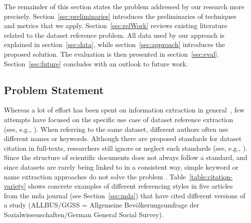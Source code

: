 \documentclass{IOS-Book-Article}
\begin{document}
The remainder of this section states the problem addressed by our research more precisely.
Section~\ref{sec:preliminaries} introduces the preliminaries of techniques and metrics that we apply.
Section~\ref{sec:relWork} reviews existing literature related to the dataset reference problem.
All data used by our approach is explained in section~\ref{sec:data}, while section~\ref{sec:approach} introduces the proposed solution.
The evaluation is then presented in section~\ref{sec:eval}.
Section~\ref{sec:future} concludes with an outlook to future work. 
 
\subsection{Problem Statement}
Whereas a lot of effort has been spent on information extraction in general~\citep{Sarawagi2007}, few attempts have focused on the specific use case of dataset reference extraction (see, e.g., \citep{MeiyuLu2012}). 
When referring to the same dataset, different authors often use different names or keywords.
Although there are proposed standards for dataset citation in full-texts, researchers still ignore or neglect such standards (see, e.g., \cite{altman2007proposed}).
Since the structure of scientific documents does not always follow a standard, and since datasets are rarely being linked to in a consistent way,
simple keyword or name extraction approaches do not solve the problem \citep{Nadeau2007}. 
Table~\ref{table:citation-variety} shows concrete examples of different referencing styles in five articles from the mda journal (see Section~\ref{sec:mda}) that have cited different versions of a study (ALLBUS/GGSS = Allgemeine Bev\"olkerungsumfrage der Sozialwissenschaften/German General Social Survey).
\end{document}
